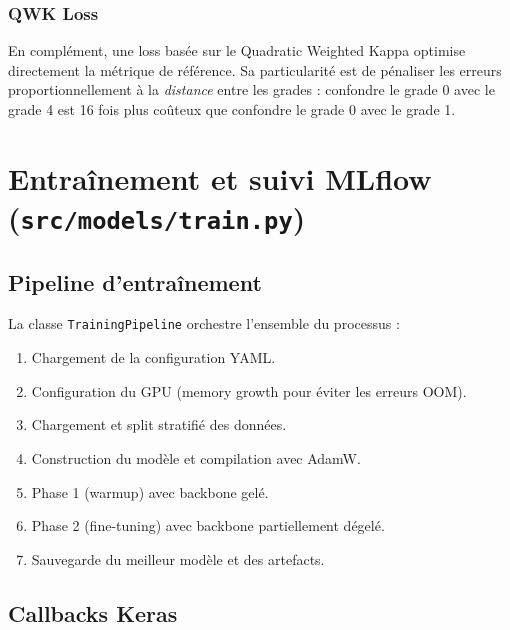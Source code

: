 ﻿\documentclass[11pt,a4paper]{article}
\begin{document}
\subsubsection{QWK Loss}

En complément, une loss basée sur le Quadratic Weighted Kappa optimise directement la métrique de référence. Sa particularité est de pénaliser les erreurs proportionnellement à la \emph{distance} entre les grades : confondre le grade 0 avec le grade 4 est 16 fois plus coûteux que confondre le grade 0 avec le grade 1.

\section{Entraînement et suivi MLflow (\texttt{src/models/train.py})}

\subsection{Pipeline d'entraînement}

La classe \texttt{TrainingPipeline} orchestre l'ensemble du processus :

\begin{enumerate}[leftmargin=2em]
  \item Chargement de la configuration YAML.
  \item Configuration du GPU (memory growth pour éviter les erreurs OOM).
  \item Chargement et split stratifié des données.
  \item Construction du modèle et compilation avec AdamW.
  \item Phase 1 (warmup) avec backbone gelé.
  \item Phase 2 (fine-tuning) avec backbone partiellement dégelé.
  \item Sauvegarde du meilleur modèle et des artefacts.
\end{enumerate}

\subsection{Callbacks Keras}
\end{document}

